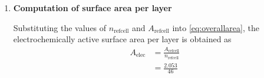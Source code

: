\begin{enumerate}[ label=\textbf{\arabic*}), leftmargin=0pt, itemindent=20pt, labelwidth=15pt, labelsep=5pt, listparindent=0.7cm, align=left]
        Since fractional layers do not have  any physical meaning, the number of
        layers that  can be  accommodated within  any pouch  must be  an integer
        quantity. Therefore,  $n_\text{refcell}$ is  computed as the  `floor' of
        the quantity in the \gls{rhs} of \cref{eq:stackheightrefcellmod}
        \begin{align}
            n_\text{refcell} &= \floor*{\frac{L_\text{stack}}{l_\text{Al} + l_\text{pos} + l_\text{sep} + l_\text{neg} + l_\text{Cu}}} \\
            {} &= \floor*{\frac{9.68}{(15 +  72 + 25 + 88 + 10) \times 10^{-3}}} \\
            n_\text{refcell} &= 46
        \end{align}

        The reference cell is thus deemed to consist of 46~layers.

    \item \textbf{Computation of surface area per layer}

        Substituting  the values  of  $n_\text{refcell}$ and  $A_\text{refcell}$
        into  \cref{eq:overallarea}, the  electrochemically active  surface area
        per layer is obtained as
        \begin{align}
            A_\text{elec} & = \frac{A_\text{refcell}}{n_\text{refcell}} \\
            {}            & = \frac{2.053}{46}                          \\
        \end{align}

\end{enumerate}






